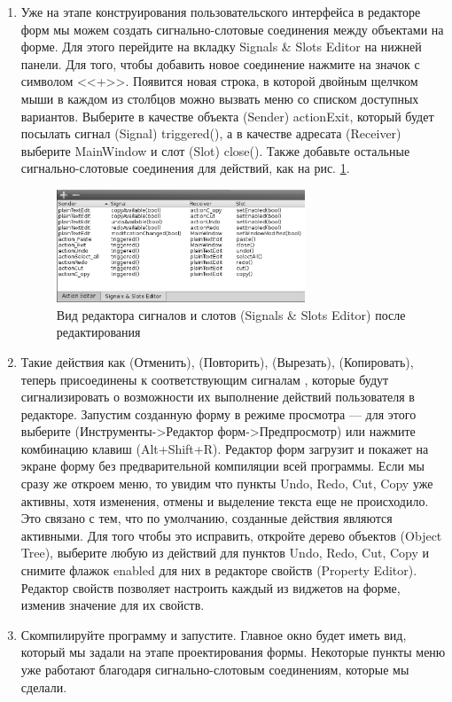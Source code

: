 \begin{enumerate}
\item Уже на этапе конструирования пользовательского интерфейса в редакторе форм мы можем создать сигнально-слотовые
соединения между объектами на форме. Для этого перейдите на вкладку Signals \& Slots Editor на нижней панели. Для того,
чтобы добавить новое соединение нажмите на значок с символом <<+>>. Появится новая строка, в которой
двойным щелчком мыши в каждом из столбцов можно вызвать меню со списком доступных вариантов. Выберите в качестве
объекта (Sender) actionExit, который будет посылать сигнал (Signal) triggered(), а в качестве адресата (Receiver)
выберите MainWindow и слот (Slot) close(). Также добавьте остальные сигнально-слотовые соединения для действий, как на
рис. \ref{ch15:refDrawing6}.

\begin{figure}[htb]
\begin{center}
\includegraphics[width=0.7\textwidth]{img/ris_15_7}
\caption[Вид редактора сигналов и слотов (Signals \& Slots Editor) после редактирования]{Вид
редактора сигналов и слотов (Signals \& Slots Editor) после редактирования}
\label{ch15:refDrawing6}
\end{center}
\end{figure}

\item Такие действия как  (Отменить),  (Повторить),  (Вырезать), 
 (Копировать), теперь присоединены к соответствующим сигналам , 
которые будут сигнализировать о возможности их выполнение действий
пользователя в редакторе. Запустим созданную форму в режиме просмотра --- для этого выберите  (Инструменты->Редактор форм->Предпросмотр) или нажмите комбинацию клавиш (Alt+Shift+R). 
Редактор форм загрузит и покажет на экране
форму без предварительной компиляции всей программы. Если мы сразу же откроем меню, 
то увидим что пункты Undo, Redo, Cut, Copy уже активны, хотя изменения, отмены и выделение текста еще не происходило. 
Это связано с тем, что по умолчанию, созданные действия являются активными. Для того чтобы это исправить, откройте дерево объектов (Object Tree), выберите любую из действий для пунктов Undo, Redo, Cut, Copy и 
снимите флажок enabled для них в редакторе свойств (Property Editor). Редактор свойств позволяет настроить каждый из виджетов на форме, изменив значение для их свойств. 
\item Скомпилируйте программу и запустите. Главное окно будет иметь вид, который мы задали на этапе проектирования
формы. Некоторые пункты меню уже работают благодаря сигнально-слотовым соединениям, которые мы сделали.
\end{enumerate}

